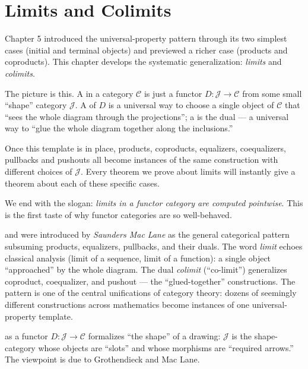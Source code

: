 \chapter{Limits and Colimits}

\begin{overviewbox}
Chapter 5 introduced the universal-property pattern through its two
simplest cases (initial and terminal objects) and previewed a richer
case (products and coproducts). This chapter develops the systematic
generalization: \emph{limits} and \emph{colimits}.

The picture is this. A  in a category $\mathcal{C}$ is just
a functor $D : \mathcal{J} \to \mathcal{C}$ from some small ``shape''
category $\mathcal{J}$. A  of $D$ is a universal way to
choose a single object of $\mathcal{C}$ that ``sees the whole diagram
through the projections''; a  is the dual --- a universal
way to ``glue the whole diagram together along the inclusions.''

Once this template is in place, products, coproducts, equalizers,
coequalizers, pullbacks and pushouts all become instances of the same
construction with different choices of $\mathcal{J}$. Every theorem we
prove about limits will instantly give a theorem about each of these
specific cases.

We end with the slogan: \emph{limits in a functor category are computed
pointwise}. This is the first taste of why functor categories are so
well-behaved.
\end{overviewbox}


\begin{nameorigin}
 and  were introduced by \emph{Saunders
Mac Lane} as the general categorical pattern subsuming products,
equalizers, pullbacks, and their duals. The word \emph{limit} echoes
classical analysis (limit of a sequence, limit of a function): a single
object ``approached'' by the whole diagram. The dual \emph{colimit}
(``co-limit'') generalizes coproduct, coequalizer, and pushout — the
``glued-together'' constructions. The pattern is one of the central
unifications of category theory: dozens of seemingly different constructions
across mathematics become instances of one universal-property template.

 as a functor $D : \mathcal{J} \to \mathcal{C}$ formalizes
``the shape'' of a drawing: $\mathcal{J}$ is the shape-category whose
objects are ``slots'' and whose morphisms are ``required arrows.''
The viewpoint is due to Grothendieck and Mac Lane.
\end{nameorigin}

